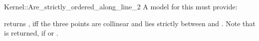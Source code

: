 \begin{ccRefFunctionObjectConcept}{Kernel::Are_strictly_ordered_along_line_2}
A model for this must provide:


          {returns , iff the three points are collinear and 
           lies strictly between  and .
          Note that  is returned, if  or
          .}
\end{ccRefFunctionObjectConcept}         

